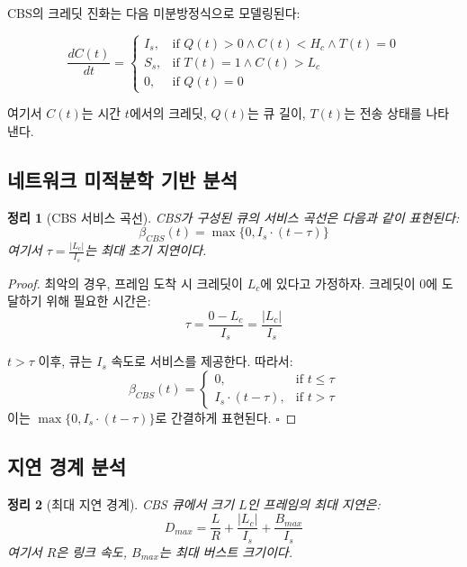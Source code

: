 \documentclass[12pt, a4paper]{article}
\newtheorem{theorem}{정리}[section]
\begin{document}
CBS의 크레딧 진화는 다음 미분방정식으로 모델링된다:

\begin{equation}
\frac{dC(t)}{dt} = 
\begin{cases}
I_s, & \text{if } Q(t) > 0 \land C(t) < H_c \land T(t) = 0 \\
S_s, & \text{if } T(t) = 1 \land C(t) > L_c \\
0, & \text{if } Q(t) = 0
\end{cases}
\end{equation}

여기서 $C(t)$는 시간 $t$에서의 크레딧, $Q(t)$는 큐 길이, $T(t)$는 전송 상태를 나타낸다.

\subsection{네트워크 미적분학 기반 분석}

\begin{theorem}[CBS 서비스 곡선]
CBS가 구성된 큐의 서비스 곡선은 다음과 같이 표현된다:
\begin{equation}
\beta_{CBS}(t) = \max\{0, I_s \cdot (t - \tau)\}
\end{equation}
여기서 $\tau = \frac{|L_c|}{I_s}$는 최대 초기 지연이다.
\end{theorem}

\begin{proof}
최악의 경우, 프레임 도착 시 크레딧이 $L_c$에 있다고 가정하자. 크레딧이 0에 도달하기 위해 필요한 시간은:
\begin{equation}
\tau = \frac{0 - L_c}{I_s} = \frac{|L_c|}{I_s}
\end{equation}

$t > \tau$ 이후, 큐는 $I_s$ 속도로 서비스를 제공한다. 따라서:
\begin{equation}
\beta_{CBS}(t) = 
\begin{cases}
0, & \text{if } t \leq \tau \\
I_s \cdot (t - \tau), & \text{if } t > \tau
\end{cases}
\end{equation}
이는 $\max\{0, I_s \cdot (t - \tau)\}$로 간결하게 표현된다. $\square$
\end{proof}

\subsection{지연 경계 분석}

\begin{theorem}[최대 지연 경계]
CBS 큐에서 크기 $L$인 프레임의 최대 지연은:
\begin{equation}
D_{max} = \frac{L}{R} + \frac{|L_c|}{I_s} + \frac{B_{max}}{I_s}
\end{equation}
여기서 $R$은 링크 속도, $B_{max}$는 최대 버스트 크기이다.
\end{theorem}
\end{document}
